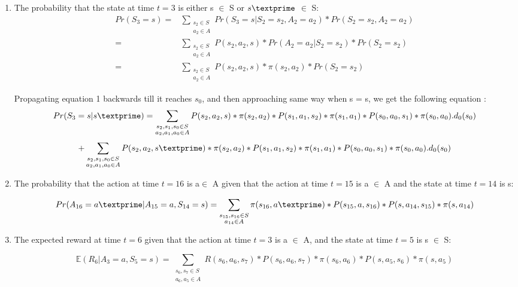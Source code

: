 \documentclass{article}
\begin{document}
\begin{enumerate}
\item The probability that the state at time \(t=3\) is either s $\in$ S or $s\textprime$ $\in$ S: \\

\begin{align}
Pr (S_3 = s) = &\sum_{\substack {s_2 \in S \\ a_2 \in A}} Pr(S_3 = s | S_2 = s_2 , A_2 = a_2) * Pr(S_2 = s_2 , A_2 = a_2) \nonumber \\
                     = &\sum_{\substack {s_2 \in S \\ a_2 \in A}}P(s_2,a_2,s) * Pr(A_2 = a_2 | S_2 = s_2) * Pr(S_2 = s_2) \nonumber  \\
                     = &\sum_{\substack {s_2 \in S \\ a_2 \in A}}P(s_2,a_2,s) * \pi(s_2,a_2) * Pr(S_2 = s_2) 
\end{align}

Propagating equation 1 backwards till it reaches $s_0$, and then approaching same way when s = s\textprime , we get the following equation : \\
\[Pr(S_3 = s|s\textprime) = \sum\limits_{\substack{s_2,s_1,s_0 \in S\\ a_2,a_1,a_0  \in A}}P(s_2, a_2,s)*\pi(s_2, a_2)*P(s_1, a_1,s_2)*\pi(s_1,a_1)*P(s_0,a_0,s_1)*\pi(s_0,a_0).d_0(s_0)\] 
\[ + \sum\limits_{\substack{s_2,s_1,s_0 \in S\\ a_2,a_1,a_0  \in A}}P(s_2, a_2,s\textprime)*\pi(s_2, a_2)*P(s_1, a_1,s_2)*\pi(s_1,a_1)*P(s_0,a_0,s_1)*\pi(s_0,a_0).d_0(s_0)\] 

\item The probability that the action at time \(t = 16\) is a\textprime $\in$ A given that the action at time \(t = 15\) is a $\in$  A and the state at time \(t = 14\) is s:

\[Pr(A_{16} = a\textprime | A_{15} = a , S_{14} = s) = \sum\limits_{\substack{s_{15},s_{16} \in S\\ a_{14}  \in A}} \pi(s_{16},a\textprime)*P(s_{15},a, s_{16})*P(s, a_{14},s_{15})*\pi(s, a_{14})\]

\item The expected reward at time \(t=6\) given that the action at time \(t=3\) is a $\in$ A, and the state at time \(t=5\) is s $\in$ S:

\[\mathbb{E}(R_6 | A_3 = a, S_5 = s) =  \sum\limits_{\substack{s_6,s_7 \in S\\ a_6,a_5 \in A}} R(s_6,a_6,s_7)*P(s_6, a_6, s_7)*\pi(s_6,a_6)*P(s, a_5, s_6)*\pi(s, a_5)\]


\end{enumerate}
\end{document}
